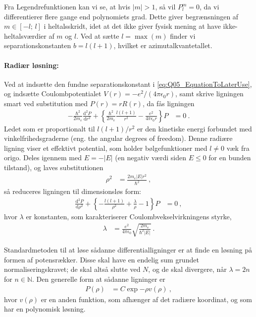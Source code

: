 Fra Legendrefunktionen kan vi se, at hvis $|m| > 1$, så vil $P_l^m = 0$, da vi differentierer flere gange end polynomiets grad. Dette giver begrænsningen af $m \in [-l;\, l]$ i heltalsskridt, idet at det ikke giver fysisk mening at have ikke-heltalsværdier af $m$ og $l$.
Ved at sætte $l = \max(m)$ finder vi separationskonstanten $b = l(l+1)$, hvilket er \textsf{azimutalkvantetallet}.


\paragraph{Radiær løsning:} Ved at indsætte den fundne separationskonstant i \cref{eq:Q05_EquationToLaterUse}, og indsætte Coulombpotentialet $V(r) = -e^2/(4\pi\epsilon_0 r)$, samt skrive ligningen smart ved substitution med $P(r) = rR(r)$, da fås ligningen
\begin{align}
    -\frac{\hbar^2}{2m_e}\frac{\text{d}^2P}{\text{d}r^2} + \left\{\frac{\hbar^2}{2m_e}\frac{l(l+1)}{r^2} - \frac{e^2}{4\pi\epsilon_0 r}\right\}P &= 0 \: .
\end{align}
Ledet som er proportionalt til $l(l+1)/r^2$ er den kinetiske energi forbundet med vinkelfrihedsgraderne (eng. the angular degrees of freedom). Denne radiære ligning viser et effektivt potential, som holder bølgefunktioner med $l \ne 0$ væk fra origo. Deles igennem med $E = -|E|$ (en negativ værdi siden $E \le 0$ for en bunden tilstand), og laves substitutionen
\begin{align}
    \rho^2 &= \frac{2m_e|E|r^2}{\hbar^2} \: ,
\end{align}
så reduceres ligningen til dimensionsløs form:
\begin{align}
    \frac{\text{d}^2P}{\text{d}\rho^2} + \left\{-\frac{l(l+1)}{\rho^2} + \frac{\lambda}{\rho} - 1\right\}P &= 0 \: ,
\end{align}
hvor $\lambda$ er konstanten, som karakteriserer Coulombvekselvirkningens styrke,
\begin{align}
    \lambda &= \frac{e^2}{4\pi\epsilon_0} \sqrt{\frac{2m_e}{\hbar^2|E|}} \: .
\end{align}

Standardmetoden til at løse sådanne differentialligninger er at finde en løsning på formen af potensrækker. Disse skal have en endelig sum grundet normaliseringskravet; de skal altså slutte ved $N$, og de skal divergere, når $\lambda = 2n$ for $n \in \mathbb{N}$. Den generelle form at sådanne ligninger er
\begin{align}
    P(\rho) &= C\exp{-\rho}v(\rho) \: ,
\end{align}
hvor $v(\rho)$ er en anden funktion, som afhænger af det radiære koordinat, og som har en polynomisk løsning.

